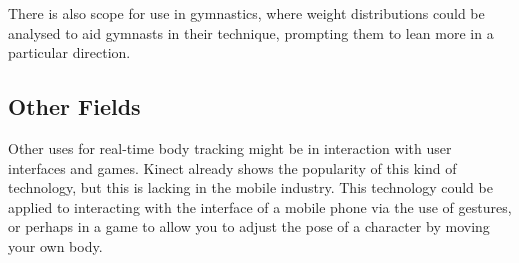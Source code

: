 There is also scope for use in gymnastics, where weight distributions could be analysed to aid gymnasts in their technique, prompting them to lean more in a particular direction.

\subsection{Other Fields}

Other uses for real-time body tracking might be in interaction with user interfaces and games. Kinect already shows the popularity of this kind of technology, but this is lacking in the mobile industry. This technology could be applied to interacting with the interface of a mobile phone via the use of gestures, or perhaps in a game to allow you to adjust the pose of a character by moving your own body.

